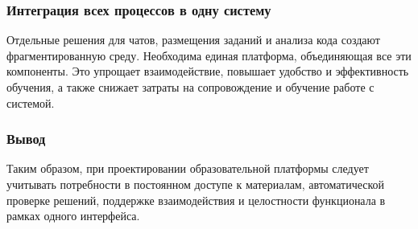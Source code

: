 \subsubsection*{Интеграция всех процессов в одну систему}
Отдельные решения для чатов, размещения заданий и анализа кода создают фрагментированную среду. Необходима единая платформа, объединяющая все эти компоненты. Это упрощает взаимодействие, повышает удобство и эффективность обучения, а также снижает затраты на сопровождение и обучение работе с системой.

\subsubsection*{Вывод}

Таким образом, при проектировании образовательной платформы следует учитывать потребности в постоянном доступе к материалам, автоматической проверке решений, поддержке взаимодействия и целостности функционала в рамках одного интерфейса.
